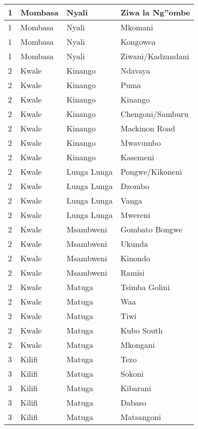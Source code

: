 \begin{table}[!ht]
\begin{tabular}{|l|l|l|l|}
        1 & Mombasa & Nyali & Ziwa la Ng''ombe \\ \hline
        1 & Mombasa & Nyali & Mkomani \\ \hline
        1 & Mombasa & Nyali & Kongowea \\ \hline
        1 & Mombasa & Nyali & Ziwani/Kadzandani \\ \hline
        2 & Kwale & Kinango & Ndavaya \\ \hline
        2 & Kwale & Kinango & Puma \\ \hline
        2 & Kwale & Kinango & Kinango \\ \hline
        2 & Kwale & Kinango & Chengoni/Samburu \\ \hline
        2 & Kwale & Kinango & Mackinon Road \\ \hline
        2 & Kwale & Kinango & Mwavumbo \\ \hline
        2 & Kwale & Kinango & Kasemeni \\ \hline
        2 & Kwale & Lunga Lunga & Pongwe/Kikoneni \\ \hline
        2 & Kwale & Lunga Lunga & Dzombo \\ \hline
        2 & Kwale & Lunga Lunga & Vanga \\ \hline
        2 & Kwale & Lunga Lunga &  Mwereni \\ \hline
        2 & Kwale & Msambweni & Gombato Bongwe \\ \hline
        2 & Kwale & Msambweni &  Ukunda \\ \hline
        2 & Kwale & Msambweni & Kinondo \\ \hline
        2 & Kwale & Msambweni & Ramisi \\ \hline
        2 & Kwale & Matuga &   Tsimba Golini \\ \hline
        2 & Kwale & Matuga & Waa \\ \hline
        2 & Kwale & Matuga & Tiwi \\ \hline
        2 & Kwale & Matuga & Kubo South \\ \hline
        2 & Kwale & Matuga & Mkongani \\ \hline
        3 & Kilifi & Matuga & Tezo \\ \hline
        3 & Kilifi & Matuga & Sokoni \\ \hline
        3 & Kilifi & Matuga & Kibarani \\ \hline
        3 & Kilifi & Matuga & Dabaso \\ \hline
        3 & Kilifi & Matuga & Matsangoni \\ \hline

\end{tabular}
\end{table}
